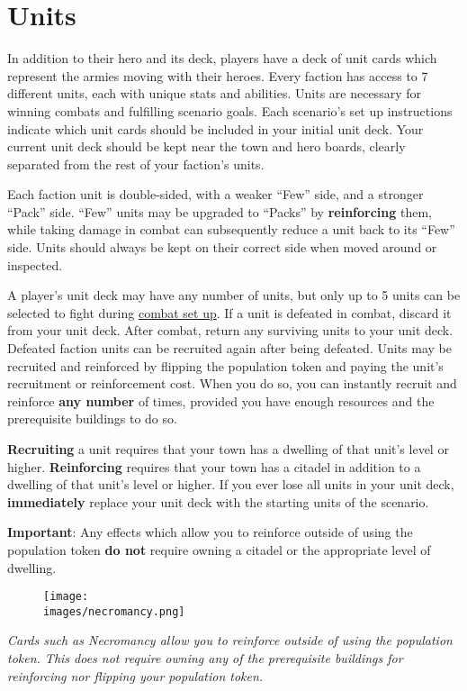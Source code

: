 \documentclass[12pt]{article}
\def\assets{assets}
\def\images{\assets/images}
\def\svgs{\assets/svgs}
\begin{document}
\clearpage
\section[Units]{Units\hypertarget{Units}{}}


In addition to their hero and its deck, players have a deck of unit cards which represent the armies moving with their heroes. Every faction has access to 7 different units, each with unique stats and abilities. Units are necessary for winning combats and fulfilling scenario goals. Each scenario's set up instructions indicate which unit cards should be included in your initial unit deck. Your current unit deck should be kept near the town and hero boards, clearly separated from the rest of your faction’s units.\par
Each faction unit is double-sided, with a weaker “Few” side, and a stronger “Pack” side. “Few” units may be upgraded to “Packs” by \textbf{reinforcing} them, while taking damage in combat can subsequently reduce a unit back to its “Few” side. Units should always be kept on their correct side when moved around or inspected.\par
A player’s unit deck may have any number of units, but only up to 5 units can be selected to fight during \hyperlink{Combatsetup}{combat set up}. If a unit is defeated in combat, discard it from your unit deck. After combat, return any surviving units to your unit deck. Defeated faction units can be recruited again after being defeated. Units may be recruited and reinforced by flipping the population token and paying the unit's recruitment  or reinforcement  cost. When you do so, you can instantly recruit and reinforce \textbf{any number} of times, provided you have enough resources and the prerequisite buildings to do so.\par
\textbf{Recruiting} a unit requires that your town has a dwelling of that unit’s level or higher. \textbf{Reinforcing} requires that your town has a citadel in addition to a dwelling of that unit’s level or higher.
 If you ever lose all units in your unit deck, \textbf{immediately} replace your unit deck with the starting units of the scenario.\par

\textbf{Important}: Any effects which allow you to reinforce outside of using the population token \textbf{do not} require owning a citadel or the appropriate level of dwelling.
\begin{figure}[h]
\centering
\texttt{[image: \\images/necromancy.png]}
\end{figure}
\begin{center}
\textit{Cards such as Necromancy allow you to reinforce outside of using the population token. This does not require owning any of the prerequisite buildings for reinforcing nor flipping your population token.}
\end{center}
\end{document}
